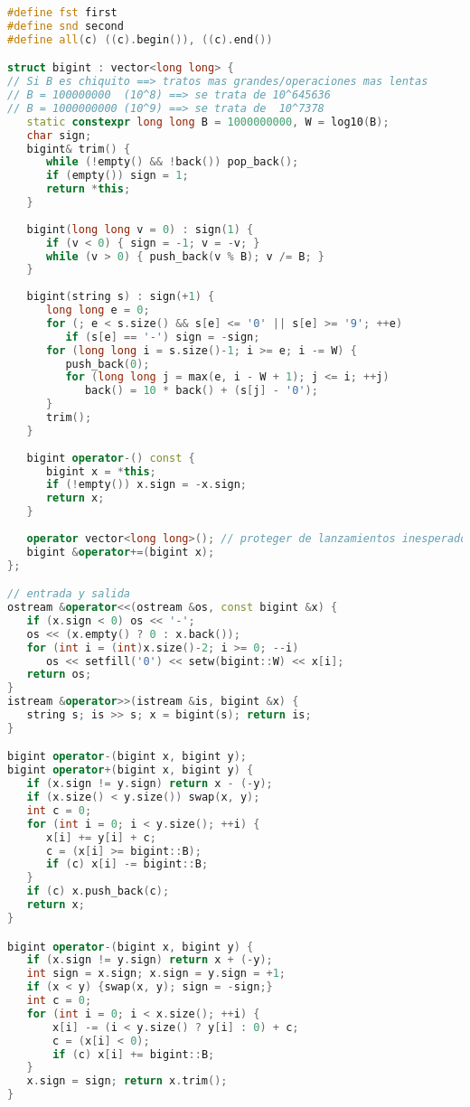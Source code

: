 \begin{lstlisting}[language=C++]
#define fst first
#define snd second
#define all(c) ((c).begin()), ((c).end())

struct bigint : vector<long long> {
// Si B es chiquito ==> tratos mas grandes/operaciones mas lentas
// B = 100000000  (10^8) ==> se trata de 10^645636
// B = 1000000000 (10^9) ==> se trata de  10^7378
   static constexpr long long B = 1000000000, W = log10(B);
   char sign;
   bigint& trim() {
      while (!empty() && !back()) pop_back();
      if (empty()) sign = 1;
      return *this;
   }
	
   bigint(long long v = 0) : sign(1) {
      if (v < 0) { sign = -1; v = -v; }
      while (v > 0) { push_back(v % B); v /= B; }
   }
   
   bigint(string s) : sign(+1) {
      long long e = 0;
      for (; e < s.size() && s[e] <= '0' || s[e] >= '9'; ++e)
         if (s[e] == '-') sign = -sign;
      for (long long i = s.size()-1; i >= e; i -= W) {
         push_back(0);
         for (long long j = max(e, i - W + 1); j <= i; ++j)
            back() = 10 * back() + (s[j] - '0');
      }
      trim();
   }
   
   bigint operator-() const {
      bigint x = *this;
      if (!empty()) x.sign = -x.sign;
      return x;
   }
   
   operator vector<long long>(); // proteger de lanzamientos inesperados
   bigint &operator+=(bigint x);
};

// entrada y salida
ostream &operator<<(ostream &os, const bigint &x) {
   if (x.sign < 0) os << '-';
   os << (x.empty() ? 0 : x.back());
   for (int i = (int)x.size()-2; i >= 0; --i)
      os << setfill('0') << setw(bigint::W) << x[i];
   return os;
}
istream &operator>>(istream &is, bigint &x) {
   string s; is >> s; x = bigint(s); return is;
}

bigint operator-(bigint x, bigint y);
bigint operator+(bigint x, bigint y) {
   if (x.sign != y.sign) return x - (-y);
   if (x.size() < y.size()) swap(x, y);
   int c = 0;
   for (int i = 0; i < y.size(); ++i) {
      x[i] += y[i] + c;
      c = (x[i] >= bigint::B);
      if (c) x[i] -= bigint::B;
   }
   if (c) x.push_back(c);
   return x;
}

bigint operator-(bigint x, bigint y) {
   if (x.sign != y.sign) return x + (-y);
   int sign = x.sign; x.sign = y.sign = +1;
   if (x < y) {swap(x, y); sign = -sign;}
   int c = 0;
   for (int i = 0; i < x.size(); ++i) {
       x[i] -= (i < y.size() ? y[i] : 0) + c;
       c = (x[i] < 0);
       if (c) x[i] += bigint::B;
   }
   x.sign = sign; return x.trim();
}


\end{lstlisting}
